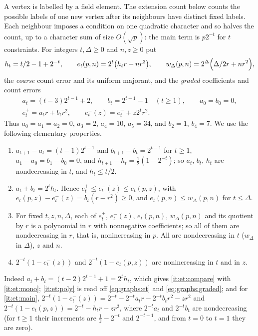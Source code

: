 A vertex is labelled by a field element. The extension count below counts the
possible labels of one new vertex after its neighbours have distinct fixed
labels. Each neighbour imposes a condition on one quadratic character and so
halves the count, up to a character sum of size $O(\sqrt p)$: the main term is
$p2^{-t}$ for $t$ constraints. For integers $t,\Delta\ge0$ and $n,z\ge0$ put
\begin{equation}\label{eq:graphs:et}
 h_t=\frac t2-1+2^{-t},\qquad e_t(p,n)=2^t\bigl(h_tr+nr^2\bigr),\qquad
 w_\Delta(p,n)=2^\Delta\Bigl(\frac\Delta2r+nr^2\Bigr),
\end{equation}
the \emph{coarse} count error and its uniform majorant, and the \emph{graded}
coefficients and count errors
\begin{equation}\label{eq:graphs:graded}
\begin{gathered}
 a_t=(t-3)2^{t-1}+2,\qquad b_t=2^{t-1}-1\quad(t\ge1),\qquad a_0=b_0=0,\\
 e^+_t=a_tr+b_tr^2,\qquad e^-_t(z)=e^+_t+z2^tr^2 .
\end{gathered}
\end{equation}
Thus $a_0=a_1=a_2=0$, $a_3=2$, $a_4=10$, $a_5=34$, and $b_2=1$, $b_4=7$. We use
the following elementary properties.
\begin{enumerate}[label=\textup{(E\arabic*)}]
\item\label{it:et:mono} $a_{t+1}-a_t=(t-1)2^{t-1}$ and $b_{t+1}-b_t=2^{t-1}$
 for $t\ge1$, $a_1-a_0=b_1-b_0=0$, and $h_{t+1}-h_t=\frac12(1-2^{-t})$; so
 $a_t$, $b_t$, $h_t$ are nondecreasing in $t$, and $h_t\le t/2$.
\item\label{it:et:compare} $a_t+b_t=2^th_t$. Hence
 $e^+_t\le e^-_t(z)\le e_t(p,z)$, with $e_t(p,z)-e^-_t(z)=b_t(r-r^2)\ge0$, and
 $e_t(p,n)\le w_\Delta(p,n)$ for $t\le\Delta$.
\item\label{it:et:poly} For fixed $t,z,n,\Delta$, each of $e^+_t$, $e^-_t(z)$,
 $e_t(p,n)$, $w_\Delta(p,n)$ and its quotient by $r$ is a polynomial in $r$ with
 nonnegative coefficients; so all of them are nondecreasing in $r$, that is,
 nonincreasing in $p$. All are nondecreasing in $t$ ($w_\Delta$ in $\Delta$), $z$
 and $n$.
\item\label{it:et:main} $2^{-t}(1-e^-_t(z))$ and $2^{-t}(1-e_t(p,z))$ are
 nonincreasing in $t$ and in $z$.
\end{enumerate}
Indeed $a_t+b_t=(t-2)2^{t-1}+1=2^th_t$, which gives \ref{it:et:compare} with
\ref{it:et:mono}; \ref{it:et:poly} is read off \eqref{eq:graphs:et} and
\eqref{eq:graphs:graded}; and for \ref{it:et:main},
$2^{-t}(1-e^-_t(z))=2^{-t}-2^{-t}a_tr-2^{-t}b_tr^2-zr^2$ and
$2^{-t}(1-e_t(p,z))=2^{-t}-h_tr-zr^2$, where $2^{-t}a_t$ and $2^{-t}b_t$ are
nondecreasing (for $t\ge1$ their increments are $\frac12-2^{-t}$ and
$2^{-t-1}$, and from $t=0$ to $t=1$ they are zero).

